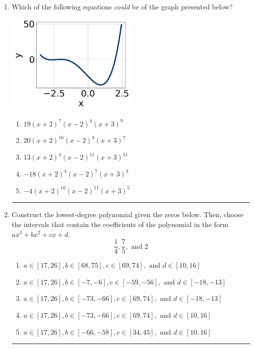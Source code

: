 \documentclass[14pt]{extbook}
\newcommand{\litem}[1]{\item#1\hspace*{-1cm}\rule{\textwidth}{0.4pt}}
\begin{document}
\begin{enumerate}
\litem{
Which of the following equations \textit{could} be of the graph presented below?
\begin{center}
    \includegraphics[width=0.5\textwidth]{../Figures/polyGraphToFunctionB.png}
\end{center}
\begin{enumerate}[label=\Alph*.]
\item \( 19(x + 2)^{7} (x - 2)^{4} (x + 3)^{9} \)
\item \( 20(x + 2)^{10} (x - 2)^{8} (x + 3)^{7} \)
\item \( 13(x + 2)^{4} (x - 2)^{11} (x + 3)^{11} \)
\item \( -18(x + 2)^{4} (x - 2)^{7} (x + 3)^{4} \)
\item \( -4(x + 2)^{10} (x - 2)^{11} (x + 3)^{5} \)

\end{enumerate} }
\litem{
Construct the lowest-degree polynomial given the zeros below. Then, choose the intervals that contain the coefficients of the polynomial in the form $ax^3+bx^2+cx+d$.\[ \frac{1}{4}, \frac{7}{5}, \text{ and } 2 \]\begin{enumerate}[label=\Alph*.]
\item \( a \in [17, 26], b \in [68, 75], c \in [69, 74], \text{ and } d \in [10, 16] \)
\item \( a \in [17, 26], b \in [-7, -6], c \in [-59, -56], \text{ and } d \in [-18, -13] \)
\item \( a \in [17, 26], b \in [-73, -66], c \in [69, 74], \text{ and } d \in [-18, -13] \)
\item \( a \in [17, 26], b \in [-73, -66], c \in [69, 74], \text{ and } d \in [10, 16] \)
\item \( a \in [17, 26], b \in [-66, -58], c \in [34, 45], \text{ and } d \in [10, 16] \)


\end{enumerate}}
\end{enumerate}
\end{document}
